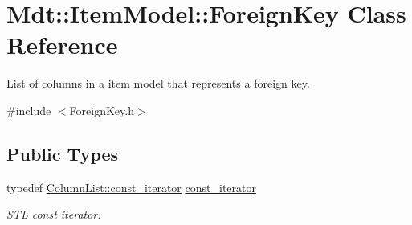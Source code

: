 \hypertarget{class_mdt_1_1_item_model_1_1_foreign_key}{}\section{Mdt\+:\+:Item\+Model\+:\+:Foreign\+Key Class Reference}
\label{class_mdt_1_1_item_model_1_1_foreign_key}


List of columns in a item model that represents a foreign key.  




{\ttfamily \#include $<$Foreign\+Key.\+h$>$}

\subsection*{Public Types}
\begin{DoxyCompactItemize}
\item 
typedef \hyperlink{class_mdt_1_1_item_model_1_1_row_column_list_base_ab6fc8d06705e4434201915f0c9860721}{Column\+List\+::const\+\_\+iterator} \hyperlink{class_mdt_1_1_item_model_1_1_foreign_key_a3cdc4141d54d7a7df5766c6b0c3fcf57}{const\+\_\+iterator}\hypertarget{class_mdt_1_1_item_model_1_1_foreign_key_a3cdc4141d54d7a7df5766c6b0c3fcf57}{}\label{class_mdt_1_1_item_model_1_1_foreign_key_a3cdc4141d54d7a7df5766c6b0c3fcf57}

\begin{DoxyCompactList}\small\item\em S\+TL const iterator. \end{DoxyCompactList}\end{DoxyCompactItemize}
